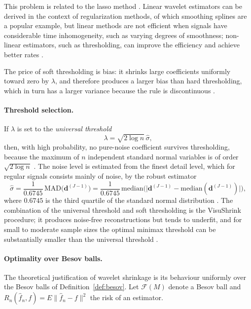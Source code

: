 This problem is related to the lasso method \cite[Sec.~6.3.1]{vidakovic1999}.
Linear wavelet estimators can be derived in the context of regularization
methods, of which smoothing splines are a popular example, but linear
methods are not efficient when signals have considerable time
inhomogeneity, such as varying degrees of smoothness; non-linear estimators,
such as thresholding, can improve the efficiency and achieve better rates
\cite[Sec.~6.2]{vidakovic1999}.

The price of soft thresholding is bias: it shrinks large coefficients
uniformly toward zero by $\lambda$, and therefore produces a larger bias
than hard thresholding, which in turn has a larger variance because the rule
is discontinuous \cite[Sec.~6.5.1]{vidakovic1999}. 

\paragraph{Threshold selection.} If $\lambda$ is set to the
\emph{universal threshold}
\begin{equation}
\lambda = \sqrt{2\log n}\,\hat{\sigma},
\label{eq:universal_threshold}
\end{equation}
then, with high probability, no pure-noise coefficient survives
thresholding, because the maximum of $n$ independent standard normal
variables is of order $\sqrt{2\log n}$ \cite[Sec.~6.6]{vidakovic1999}. The
noise level is estimated from the finest detail level, which for regular
signals consists mainly of noise, by the robust estimator
\begin{equation}
\hat{\sigma} = \frac{1}{0.6745}\,\mathrm{MAD}\bigl(\mathbf{d}^{(J-1)}\bigr)
= \frac{1}{0.6745}\,\mathrm{median}\bigl(\bigl|\mathbf{d}^{(J-1)}-
\mathrm{median}(\mathbf{d}^{(J-1)})\bigr|\bigr),
\label{eq:mad_sigma}
\end{equation}
where $0.6745$ is the third quartile of the standard normal distribution
\cite[Sec.~6.6]{vidakovic1999}. The combination of the universal threshold
and soft thresholding is the VisuShrink procedure; it produces noise-free
reconstructions but tends to underfit, and for small to moderate sample
sizes the optimal minimax threshold can be substantially smaller than the
universal threshold \cite[Sec.~6.6]{vidakovic1999}.

\paragraph{Optimality over Besov balls.} The theoretical justification of
wavelet shrinkage is its behaviour uniformly over the Besov balls of
Definition~\ref{def:besov}. Let $\mathcal{F}(M)$ denote a Besov ball and
$R_n(\hat{f}_n,f) = E\|\hat{f}_n-f\|^2$ the risk of an estimator.

